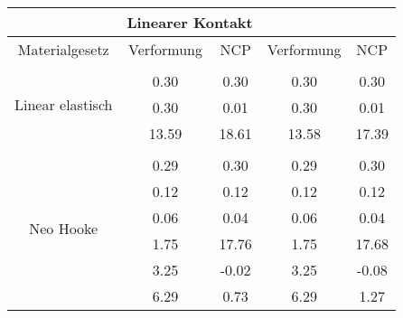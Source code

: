 \begin{table} 
\centering 
\begin{tabular}{c|cc|cc|} 
\cline{2-5} 
 & \multicolumn{2}{|c|}{Linearer Kontakt} &  \\ 
\hline 
\multicolumn{1}{|c|}{Materialgesetz} & \multicolumn{1}{c|}{Verformung} & \multicolumn{1}{c|}{NCP} & \multicolumn{1}{c|}{Verformung} & \multicolumn{1}{c|}{NCP} \\ 
\hline 
\multicolumn{1}{|c|}{\multirow{4}{*}{Linear elastisch}} &\multicolumn{1}{|c|}{} & \multicolumn{1}{|c|}{} & \multicolumn{1}{|c|}{} & \multicolumn{1}{|c|}{} \\ 
\multicolumn{1}{|c|}{} & \multicolumn{1}{|c|}{      0.30} & \multicolumn{1}{|c|}{      0.30} & \multicolumn{1}{|c|}{      0.30} & \multicolumn{1}{|c|}{      0.30} \\ 
\multicolumn{1}{|c|}{} & \multicolumn{1}{|c|}{      0.30} & \multicolumn{1}{|c|}{      0.01} & \multicolumn{1}{|c|}{      0.30} & \multicolumn{1}{|c|}{      0.01} \\ 
\multicolumn{1}{|c|}{} & \multicolumn{1}{|c|}{     13.59} & \multicolumn{1}{|c|}{     18.61} & \multicolumn{1}{|c|}{     13.58} & \multicolumn{1}{|c|}{     17.39} \\ 
\hline 
\multicolumn{1}{|c|}{\multirow{7}{*}{Neo Hooke}} &\multicolumn{1}{|c|}{} & \multicolumn{1}{|c|}{} & \multicolumn{1}{|c|}{} & \multicolumn{1}{|c|}{} \\ 
\multicolumn{1}{|c|}{} & \multicolumn{1}{|c|}{      0.29} & \multicolumn{1}{|c|}{      0.30} & \multicolumn{1}{|c|}{      0.29} & \multicolumn{1}{|c|}{      0.30} \\ 
\multicolumn{1}{|c|}{} & \multicolumn{1}{|c|}{      0.12} & \multicolumn{1}{|c|}{      0.12} & \multicolumn{1}{|c|}{      0.12} & \multicolumn{1}{|c|}{      0.12} \\ 
\multicolumn{1}{|c|}{} & \multicolumn{1}{|c|}{      0.06} & \multicolumn{1}{|c|}{      0.04} & \multicolumn{1}{|c|}{      0.06} & \multicolumn{1}{|c|}{      0.04} \\ 
\multicolumn{1}{|c|}{} & \multicolumn{1}{|c|}{      1.75} & \multicolumn{1}{|c|}{     17.76} & \multicolumn{1}{|c|}{      1.75} & \multicolumn{1}{|c|}{     17.68} \\ 
\multicolumn{1}{|c|}{} & \multicolumn{1}{|c|}{      3.25} & \multicolumn{1}{|c|}{     -0.02} & \multicolumn{1}{|c|}{      3.25} & \multicolumn{1}{|c|}{     -0.08} \\ 
\multicolumn{1}{|c|}{} & \multicolumn{1}{|c|}{      6.29} & \multicolumn{1}{|c|}{      0.73} & \multicolumn{1}{|c|}{      6.29} & \multicolumn{1}{|c|}{      1.27} \\ 

\end{tabular}
\end{table}

